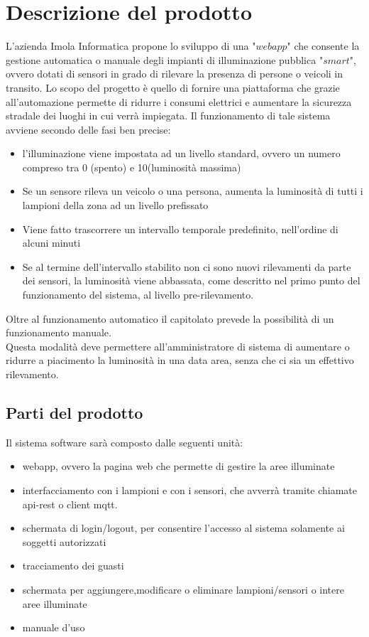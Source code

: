 \documentclass[12pt]{article}
\begin{document}
\section{Descrizione del prodotto}
L'azienda Imola Informatica propone lo sviluppo di una "$webapp$" che consente la gestione automatica o manuale degli impianti di illuminazione pubblica "$smart$", ovvero dotati di sensori in grado di rilevare la presenza di persone o veicoli in transito.
Lo scopo del progetto è quello di fornire una piattaforma che grazie all'automazione permette di ridurre i consumi elettrici e aumentare la sicurezza stradale dei luoghi in cui verrà impiegata.
Il funzionamento di tale sistema avviene secondo delle fasi ben precise:
\begin{itemize}
	\item l'illuminazione viene impostata ad un livello standard, ovvero un numero compreso tra 0 (spento) e 10(luminosità massima)
	\item Se un sensore rileva un veicolo o una persona, aumenta la luminosità di tutti i lampioni della zona ad un livello prefissato
	\item Viene fatto trascorrere un intervallo temporale predefinito, nell'ordine di alcuni minuti
	\item Se al termine dell'intervallo stabilito non ci sono nuovi rilevamenti da parte dei sensori, la luminosità viene abbassata, come descritto nel primo punto del funzionamento del sistema, al livello pre-rilevamento.
\end{itemize}
Oltre al funzionamento automatico il capitolato prevede la possibilità di un funzionamento manuale. \\
Questa modalità deve permettere all'amministratore di sistema di aumentare o ridurre a piacimento la luminosità in una data area, senza che ci sia un effettivo rilevamento.

\subsection{Parti del prodotto}
Il sistema software sarà composto dalle seguenti unità:
\begin{itemize}
	\item webapp, ovvero la pagina web che permette di gestire la aree illuminate
	\item interfacciamento con i lampioni e con i sensori, che avverrà tramite chiamate api-rest o client mqtt.
	\item schermata di login/logout, per consentire l'accesso al sistema solamente ai soggetti autorizzati
	\item tracciamento dei guasti
	\item schermata per aggiungere,modificare o eliminare lampioni/sensori o intere aree illuminate
	\item manuale d'uso
\end{itemize}
\end{document}
